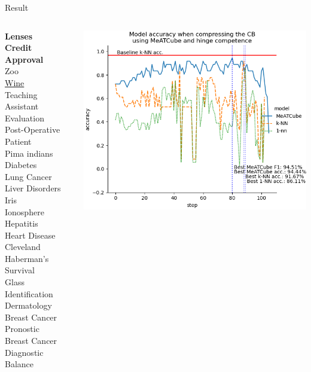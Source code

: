 \documentclass[]{beamer}
\begin{document}
\begin{frame}{Result}
    \begin{columns}
        \begin{column}{.35\textwidth}
            {\smaller\smaller
            \textbf{Lenses} \\
            \textbf{Credit Approval} \\
            Zoo \\
            \underline{Wine} \\
            Teaching Assistant Evaluation \\
            Post-Operative Patient \\
            Pima indians Diabetes \\
            Lung Cancer \\
            Liver Disorders \\
            Iris \\
            Ionosphere \\
            Hepatitis \\
            Heart Disease Cleveland \\
            Haberman's Survival \\
            Glass Identification \\
            Dermatology \\
            Breast Cancer Pronostic \\
            Breast Cancer Diagnostic \\
            Balance\\
            ~}
        \end{column}
        \begin{column}{.65\textwidth}
            \includegraphics[width=.8\textwidth]{../results/figs/wine}

\end{column}
\end{columns}
\end{frame}
\end{document}
